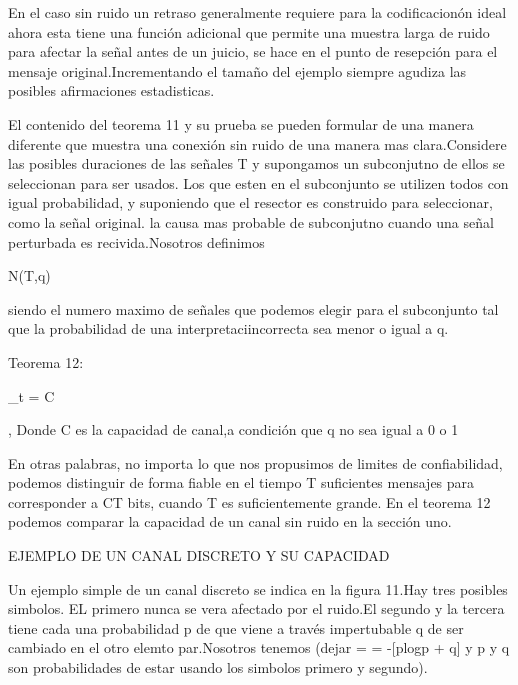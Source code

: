 En el caso sin ruido un retraso generalmente requiere para la codificacion\'on ideal ahora 
esta tiene una funci\'on adicional que permite una muestra larga de ruido para afectar la señal antes de un juicio, se hace 
en el punto de resepci\'on  para el mensaje original.Incrementando el tamaño del ejemplo siempre agudiza las posibles afirmaciones estadisticas.

El contenido del teorema 11 y su prueba se pueden formular de una manera diferente que muestra 
una conexi\'on sin ruido de una manera mas clara.Considere las posibles duraciones de las señales T y supongamos 
un subconjutno de ellos se seleccionan para ser usados. Los que esten en el subconjunto se utilizen todos con igual probabilidad, y suponiendo 
que el resector es construido para seleccionar, como la señal original. la causa mas probable de subconjutno cuando 
una señal perturbada es recivida.Nosotros definimos \begin{em}N(T,q)\end{em} siendo el numero maximo de señales que podemos elegir para el subconjunto tal que la probabilidad de una interpretaci\on incorrecta sea menor o igual a q.

\begin{em}Teorema 12:\end{em} \displaystyle\lim_{t \to{}\infty} = C \begin{em}, Donde C es la capacidad de canal,a condici\'on que q no sea igual a 0 o 1\end{em}

En otras palabras, no importa lo que nos propusimos de limites de confiabilidad, podemos distinguir de forma fiable en el tiempo T 
suficientes mensajes para corresponder a CT bits, cuando T es suficientemente grande. En el teorema 12 podemos comparar 
la capacidad de un canal sin ruido en la secci\'on uno.

\begin{center}
EJEMPLO DE UN CANAL DISCRETO Y SU CAPACIDAD
\end{center} 

Un ejemplo simple de un canal discreto se indica en la figura 11.Hay tres posibles simbolos. EL primero 
nunca se vera afectado por el ruido.El segundo y la tercera tiene cada una probabilidad p de que viene a trav\'es impertubable q de ser cambiado en el otro elemto par.Nosotros tenemos (dejar =  \alpha = -[plogp + q] y p y q son probabilidades de estar usando los simbolos primero y segundo).


